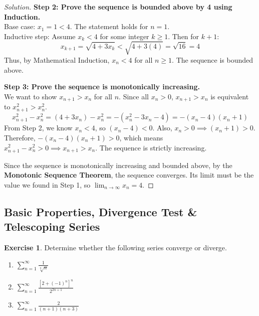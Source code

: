 \documentclass[11pt]{article}
\theoremstyle{definition}
\newtheorem{exercise}{Exercise}[section]
\newenvironment{solution}{\begin{proof}[Solution]}{\end{proof}}
\begin{document}
\begin{solution}
\textbf{Step 2: Prove the sequence is bounded above by 4 using Induction.} \\
Base case: $x_1 = 1 < 4$. The statement holds for $n=1$. \\
Inductive step: Assume $x_k < 4$ for some integer $k \ge 1$.
Then for $k+1$:
\[
x_{k+1} = \sqrt{4+3x_k} < \sqrt{4+3(4)} = \sqrt{16} = 4
\]
Thus, by Mathematical Induction, $x_n < 4$ for all $n \ge 1$. The sequence is bounded above.

\textbf{Step 3: Prove the sequence is monotonically increasing.} \\
We want to show $x_{n+1} > x_n$ for all $n$.
Since all $x_n > 0$, $x_{n+1} > x_n$ is equivalent to $x_{n+1}^2 > x_n^2$.
\[
x_{n+1}^2 - x_n^2 = (4+3x_n) - x_n^2 = -(x_n^2 - 3x_n - 4) = -(x_n - 4)(x_n + 1)
\]
From Step 2, we know $x_n < 4$, so $(x_n - 4) < 0$. Also, $x_n > 0 \implies (x_n + 1) > 0$.
Therefore, $-(x_n - 4)(x_n + 1) > 0$, which means $x_{n+1}^2 - x_n^2 > 0 \implies x_{n+1} > x_n$.
The sequence is strictly increasing.

Since the sequence is monotonically increasing and bounded above, by the \textbf{Monotonic Sequence Theorem}, the sequence converges. Its limit must be the value we found in Step 1, so $\lim_{n \to \infty} x_n = 4$.
\end{solution}

\subsection{Basic Properties, Divergence Test \& Telescoping Series}

\begin{exercise}
Determine whether the following series converge or diverge.
\begin{enumerate}
    \item $\displaystyle \sum_{n=1}^{\infty} \frac{1}{\sqrt[n]{n}}$
    \item $\displaystyle \sum_{n=1}^{\infty} \frac{\left[2+(-1)^n\right]^n}{2^{2n+1}}$
    \item $\displaystyle \sum_{n=1}^{\infty} \frac{2}{(n+1)(n+3)}$
\end{enumerate}
\end{exercise}
\end{document}

